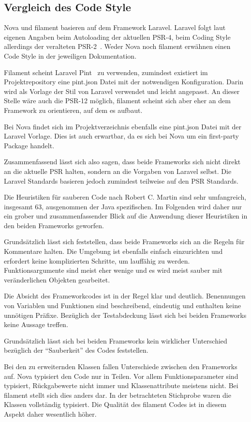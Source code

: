 \subsection{Vergleich des Code Style}
Nova und filament basieren auf dem Framework Laravel.
Laravel folgt laut eigenen Angaben beim Autoloading der aktuellen PSR-4, beim Coding Style allerdings der veralteten PSR-2~\cite{laravel-docs-coding-style}.
Weder Nova noch filament erwähnen einen Code Style in der jeweiligen Dokumentation.

Filament scheint Laravel Pint~\cite{laravel-docs-pint} zu verwenden, zumindest existiert im Projektrepository eine pint.json Datei mit der notwendigen Konfiguration.
Darin wird als Vorlage der Stil von Laravel verwendet und leicht angepasst.
An dieser Stelle wäre auch die PSR-12 möglich, filament scheint sich aber eher an dem Framework zu orientieren, auf dem es aufbaut.

Bei Nova findet sich im Projektverzeichnis ebenfalls eine pint.json Datei mit der Laravel Vorlage.
Dies ist auch erwartbar, da es sich bei Nova um ein first-party Package handelt.

Zusammenfassend lässt sich also sagen, dass beide Frameworks sich nicht direkt an die aktuelle PSR halten, sondern an die Vorgaben von Laravel selbst.
Die Laravel Standards basieren jedoch zumindest teilweise auf den PSR Standards.

Die Heuristiken für sauberen Code nach Robert C. Martin sind sehr umfangreich, insgesamt 63, ausgenommen der Java spezifischen.
Im Folgenden wird daher nur ein grober und zusammenfassender Blick auf die Anwendung dieser Heuristiken in den beiden Frameworks geworfen.

Grundsätzlich lässt sich feststellen, dass beide Frameworks sich an die Regeln für Kommentare halten.
Die Umgebung ist ebenfalls einfach einzurichten und erfordert keine komplizierten Schritte, um lauffähig zu werden.
Funktionsargumente sind meist eher wenige und es wird meist sauber mit veränderlichen Objekten gearbeitet.

Die Absicht des Frameworkcodes ist in der Regel klar und deutlich.
Benennungen von Variablen und Funktionen sind beschreibend, eindeutig und enthalten keine unnötigen Präfixe.
Bezüglich der Testabdeckung lässt sich bei beiden Frameworks keine Aussage treffen.

Grundsätzlich lässt sich bei beiden Frameworks kein wirklicher Unterschied bezüglich der \enquote{Sauberkeit} des Codes feststellen.

\newpage

Bei den zu erweiternden Klassen fallen Unterschiede zwischen den Frameworks auf.
Nova typisiert den Code nur in Teilen.
Vor allem Funktionsparameter sind typisiert, Rückgabewerte nicht immer und Klassenattribute meistens nicht.
Bei filament stellt sich dies anders dar.
In der betrachteten Stichprobe waren die Klassen vollständig typisiert.
Die Qualität des filament Codes ist in diesem Aspekt daher wesentlich höher.

